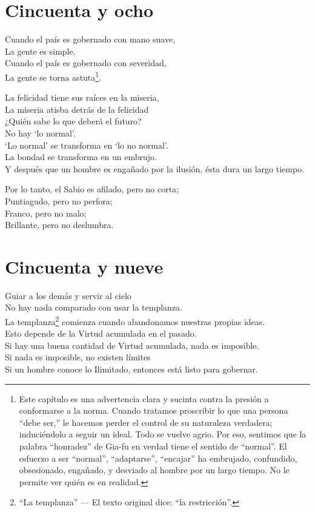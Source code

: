 \documentclass[book,b5paper,hidelinks,final]{memoir}
\begin{document}
	\chapter*{Cincuenta y ocho}
	
	Cuando el país es gobernado con mano suave,\\
	La gente es simple.\\
	Cuando el país es gobernado con severidad,\\
	La gente se torna astuta\footnote{Este capítulo es una advertencia clara y sucinta contra la presión a
		conformarse a la norma. Cuando tratamos proscribir lo que una persona
		``debe ser,'' le hacemos perder el control de su naturaleza verdadera;
		induciéndolo a seguir un ideal. Todo se vuelve agrio. Por eso, sentimos
		que la palabra ``honradez'' de Gia-fu en verdad tiene el sentido de
		``normal''. El esfuerzo a ser ``normal'', ``adaptarse'', ``encajar'' ha
		embrujado, confundido, obsesionado, engañado, y desviado al hombre por
		un largo tiempo. No le permite ver quién es en realidad.}.
	
	La felicidad tiene sus raíces en la miseria,\\
	La miseria atisba detrás de la felicidad\\
	¿Quién sabe lo que deberá el futuro?\\
	No hay `lo normal'.\\
	`Lo normal' se transforma en `lo no normal'.\\
	La bondad se transforma en un embrujo.\\
	Y después que un hombre es engañado por la ilusión, ésta dura un largo
	tiempo.
	
	Por lo tanto, el Sabio es afilado, pero no corta;\\
	Puntiagudo, pero no perfora;\\
	Franco, pero no malo;\\
	Brillante, pero no deslumbra.
	
	\chapter*{Cincuenta y nueve}
	
	Guiar a los demás y servir al cielo\\
	No hay nada comparado con usar la templanza.\\
	La templanza\footnote{``La templanza'' --- El texto original dice: ``la restricción''.} comienza cuando abandonamos nuestras propias ideas.\\
	Esto depende de la Virtud acumulada en el pasado.\\
	Si hay una buena cantidad de Virtud acumulada, nada es imposible.\\
	Si nada es imposible, no existen límites\\
	Si un hombre conoce lo Ilimitado, entonces está listo para gobernar.
	
\end{document}

